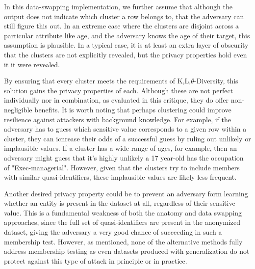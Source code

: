 In this data-swapping implementation, we further assume that although the output does not indicate which cluster a row belongs to, that the adversary can still figure this out. In an extreme case where the clusters are disjoint across a particular attribute like age, and the adversary knows the age of their target, this assumption is plausible. In a typical case, it is at least an extra layer of obscurity that the clusters are not explicitly revealed, but the privacy properties hold even it it were revealed.

By ensuring that every cluster meets the requirements of K,L,$\theta$-Diversity, this solution gains the privacy properties of each. Although these are not perfect individually nor in combination, as evaluated in this critique\cite{domingoCritique}, they do offer non-negligible benefits. It is worth noting that perhaps clustering could improve resilience against attackers with background knowledge. For example, if the adversary has to guess which sensitive value corresponds to a given row within a cluster, they can icnrease their odds of a successful guess by ruling out unlikely or implausible values. If a cluster has a wide range of ages, for example, then an adversary might guess that it's highly unlikely a 17 year-old has the occupation of "Exec-managerial". However, given that the clusters try to include members with similar quasi-identifiers, these implausible values are likely less frequent.

Another desired privacy property could be to prevent an adversary form learning whether an entity is present in the dataset at all, regardless of their sensitive value. This is a fundamental weakness of both the anatomy and data swapping approaches, since the full set of quasi-identifiers are present in the anonymized dataset, giving the adversary a very good chance of succeeding in such a membership test. However, as mentioned, none of the alternative methods fully address membership testing as even datasets produced with generalization do not protect against this type of attack in principle or in practice.

